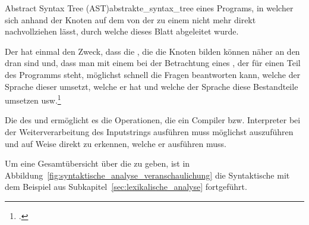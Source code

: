 \begin{Definition}{Abstract Syntax Tree (AST)}{abstrakte_syntax_tree}
   eines Programs, in welcher sich anhand der Knoten auf dem  von der  zu einem  nicht mehr direkt nachvollziehen lässt, durch welche  dieses Blatt abgeleitet wurde.

Der  hat einmal den Zweck, dass die , die die Knoten bilden können  näher an den  dran sind und, dass man mit einem  bei der Betrachtung eines , der für einen Teil des Programms steht, möglichst schnell die Fragen beantworten kann, welche  der Sprache dieser umsetzt, welche  er hat und welche  der Sprache diese Bestandteile umsetzen usw.\footcite{g_siek_course_2022}
\end{Definition}

Die  des  und  ermöglicht es die Operationen, die ein Compiler bzw. Interpreter bei der Weiterverarbeitung des Inputstrings ausführen muss möglichst  auszuführen und auf  Weise direkt zu erkennen, welche er ausführen muss.


Um eine Gesamtübersicht über die  zu geben, ist in Abbildung~\ref{fig:syntaktische_analyse_veranschaulichung} die Syntaktische mit dem Beispiel aus Subkapitel~\ref{sec:lexikalische_analyse} fortgeführt.

